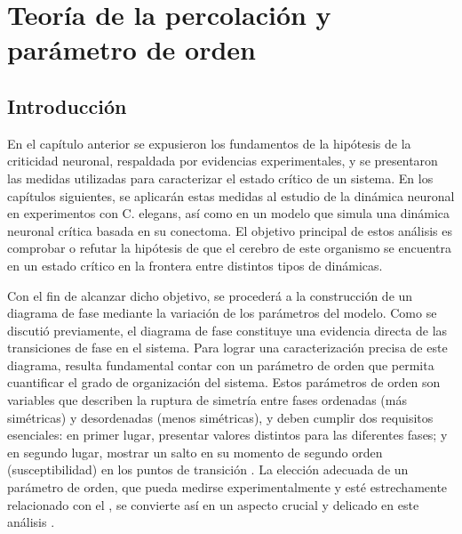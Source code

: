\chapter{Teoría de la percolación y parámetro de orden}\label{sec:cap-percolacion}
\graphicspath{{figs/capitulo_percolacion/}}



\section{Introducción}

En el capítulo anterior se expusieron los fundamentos de la hipótesis de la criticidad neuronal, respaldada por evidencias experimentales, y se presentaron las medidas utilizadas para caracterizar el estado crítico de un sistema. En los capítulos siguientes, se aplicarán estas medidas al estudio de la dinámica neuronal en experimentos con  C. elegans, así como en un modelo que simula una dinámica neuronal crítica basada en su conectoma. El objetivo principal de estos análisis es comprobar o refutar la hipótesis de que el cerebro de este organismo se encuentra en un estado crítico en la frontera entre distintos tipos de dinámicas.

Con el fin de alcanzar dicho objetivo, se procederá a la construcción de un diagrama de fase mediante la variación de los parámetros del modelo.  Como se discutió previamente, el diagrama de fase constituye una evidencia directa de las transiciones de fase en el sistema. Para lograr una caracterización precisa de este diagrama, resulta fundamental contar con un parámetro de orden que permita cuantificar el grado de organización del sistema. Estos parámetros de orden son variables que describen la ruptura de simetría entre fases ordenadas (más simétricas) y desordenadas  (menos simétricas), y deben cumplir dos requisitos esenciales: en primer lugar, presentar valores distintos para las diferentes fases; y en segundo lugar, mostrar un salto en su momento de segundo orden (susceptibilidad) en los puntos de transición  \cite{yin_neural_2021}. La elección adecuada de un parámetro de orden, que pueda medirse experimentalmente y esté estrechamente relacionado con el , se convierte así en un aspecto crucial y delicado en este análisis \cite{kleman_order_2003}.




